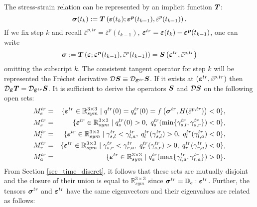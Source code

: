 \documentclass[a4paper,12pt]{article}
\theoremstyle{remark}
\newcommand{\mbf}[1]{\mbox{\boldmath$#1$}}
\numberwithin{equation}{section}
\begin{document}
The stress-strain relation can be represented by an implicit function $\mbf T$:
\begin{equation*}
\mbf{\sigma}(t_k):=\mbf T\left(\mbf{\varepsilon}(t_k);\mbf{\varepsilon^p}(t_{k-1}),\bar{\varepsilon}^p(t_{k-1})\right).
\label{T0}
\end{equation*}
If we fix step $k$ and recall $\bar{\varepsilon}^{p,tr}=\bar{\varepsilon}^p(t_{k-1})$, $\mbf\varepsilon^{tr}=\mbf\varepsilon(t_{k})-\mbf{\varepsilon^p}(t_{k-1})$, one can write
\begin{equation}
\mbf{\sigma}:=\mbf T\left(\mbf{\varepsilon};\mbf{\varepsilon^p}(t_{k-1}),\bar{\varepsilon}^p(t_{k-1})\right)=\mbf S\left(\mbf{\varepsilon}^{tr},\bar{\varepsilon}^{p,tr}\right)
\label{T}
\end{equation}
omitting the subscript $k$. The consistent tangent operator for step $k$ will be represented the Fr\' echet derivative $\mathcal D\mbf S\equiv\mathcal D_{\mbf\varepsilon^{tr}}\mbf S$. If it exists at $\left(\mbf{\varepsilon}^{tr},\bar{\varepsilon}^{p,tr}\right)$ then $\mathcal D_{\mbf{\varepsilon}}\mbf T=\mathcal D_{\mbf\varepsilon^{tr}} \mbf S$.
It is sufficient to derive the operators $\mbf S$ and $\mathcal D\mbf S$ on the following open sets:
\begin{eqnarray*}
M^{tr}_{e}&=&\{\mbf\varepsilon^{tr}\in\mathbb R^{3\times 3}_{sym}\; |\; q^{tr}(0)=q^{tr}_s(0)=f\left(\mbf{\sigma}^{tr},H(\bar{\varepsilon}^{p,tr})\right)<0\},\\
M^{tr}_{s}&=&\{\mbf\varepsilon^{tr}\in\mathbb R^{3\times 3}_{sym}\; |\; q^{tr}_s(0)>0,\; q^{tr}_s(\min\{\gamma^{tr}_{s,l},\gamma^{tr}_{s,r}\})< 0\},\\
M^{tr}_{l}&=&\{\mbf\varepsilon^{tr}\in\mathbb R^{3\times 3}_{sym}\; |\; \gamma^{tr}_{s,l}<\gamma^{tr}_{l,a},\; q^{tr}_l(\gamma^{tr}_{s,l})> 0,\; q^{tr}_l(\gamma^{tr}_{l,a})< 0\},\\
M^{tr}_{r}&=&\{\mbf\varepsilon^{tr}\in\mathbb R^{3\times 3}_{sym}\; |\; \gamma^{tr}_{s,r}<\gamma^{tr}_{r,a},\; q^{tr}_r(\gamma^{tr}_{s,r})> 0,\; q^{tr}_r(\gamma^{tr}_{r,a})< 0\},\\
M^{tr}_{a}&=&\{\mbf\varepsilon^{tr}\in\mathbb R^{3\times 3}_{sym}\; |\; q^{tr}_a(\max\{\gamma^{tr}_{l,a},\gamma^{tr}_{r,a}\})>0\}.
\end{eqnarray*}
From Section \ref{sec_time_discret}, it follows that these sets are mutually disjoint and the closure of their union is equal to $\mathbb R^{3\times 3}_{sym}$ since $\mbf{\sigma}^{tr}=\mathbb D_e:\mbf\varepsilon^{tr}$. Further, the tensors $\mbf{\sigma}^{tr}$ and $\mbf{\varepsilon}^{tr}$ have the same eigenvectors and their eigenvalues are related as follows:
\end{document}
